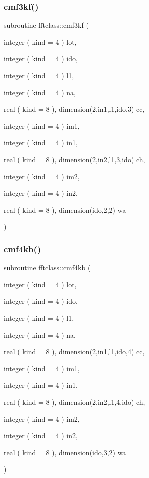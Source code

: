 \mbox{\label{namespacefftclass_a449e799516aa491a87b0f5937a7abc86}} 
\subsubsection{\texorpdfstring{cmf3kf()}{cmf3kf()}}
{\footnotesize\ttfamily subroutine fftclass\+::cmf3kf (\begin{DoxyParamCaption}\item[{integer ( kind = 4 )}]{lot,  }\item[{integer ( kind = 4 )}]{ido,  }\item[{integer ( kind = 4 )}]{l1,  }\item[{integer ( kind = 4 )}]{na,  }\item[{real ( kind = 8 ), dimension(2,in1,l1,ido,3)}]{cc,  }\item[{integer ( kind = 4 )}]{im1,  }\item[{integer ( kind = 4 )}]{in1,  }\item[{real ( kind = 8 ), dimension(2,in2,l1,3,ido)}]{ch,  }\item[{integer ( kind = 4 )}]{im2,  }\item[{integer ( kind = 4 )}]{in2,  }\item[{real ( kind = 8 ), dimension(ido,2,2)}]{wa }\end{DoxyParamCaption})}

\mbox{\label{namespacefftclass_ad51087e9f2795e7bf337d4c6b55de780}} 
\subsubsection{\texorpdfstring{cmf4kb()}{cmf4kb()}}
{\footnotesize\ttfamily subroutine fftclass\+::cmf4kb (\begin{DoxyParamCaption}\item[{integer ( kind = 4 )}]{lot,  }\item[{integer ( kind = 4 )}]{ido,  }\item[{integer ( kind = 4 )}]{l1,  }\item[{integer ( kind = 4 )}]{na,  }\item[{real ( kind = 8 ), dimension(2,in1,l1,ido,4)}]{cc,  }\item[{integer ( kind = 4 )}]{im1,  }\item[{integer ( kind = 4 )}]{in1,  }\item[{real ( kind = 8 ), dimension(2,in2,l1,4,ido)}]{ch,  }\item[{integer ( kind = 4 )}]{im2,  }\item[{integer ( kind = 4 )}]{in2,  }\item[{real ( kind = 8 ), dimension(ido,3,2)}]{wa }\end{DoxyParamCaption})}

